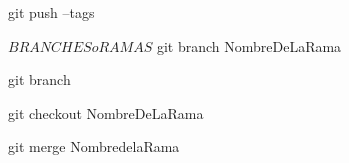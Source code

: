 	git push --tags		%


$ BRANCHES o RAMAS $
	git branch NombreDeLaRama	%
	
	git branch	%

	git checkout NombreDeLaRama		%

	















	git merge NombredelaRama	%
